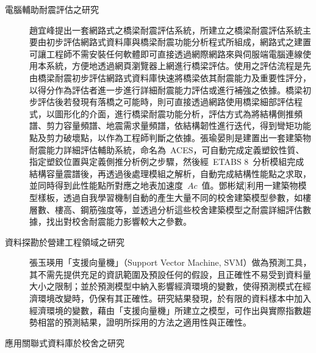\begin{description}
  \item[電腦輔助耐震評估之研究]
  趙宜峰\cite{chou2004master}提出一套網路式之橋梁耐震評估系統，所建立之橋梁耐震評估系統主要由初步評估網路式資料庫與橋梁耐震功能分析程式所組成，網路式之建置可讓工程師不需安裝任何軟體即可直接透過網際網路來與伺服端電腦連線使用本系統，方便地透過網頁瀏覽器上網進行橋梁評估。使用之評估流程是先由橋梁耐震初步評估網路式資料庫快速將橋梁依其耐震能力及重要性評分，以得分作為評估者進一步進行詳細耐震能力評估或進行補強之依據。橋梁初步評估後若發現有落橋之可能時，則可直接透過網路使用橋梁細部評估程式，以圖形化的介面，進行橋梁耐震功能分析，評估方式為將結構側推頻譜、剪力容量頻譜、地震需求量頻譜，依結構韌性進行迭代，得到彎矩功能點及剪力破壞點，以作為工程師判斷之依據。張瑜晏\cite{chang2004master}則是建置出一套建築物耐震能力詳細評估輔助系統，命名為~ACES，可自動完成定義塑鉸性質、指定塑鉸位置與定義側推分析例之步驟，然後經~ETABS 8~分析模組完成結構容量震譜後，再透過後處理模組之解析，自動完成結構性能點之求取，並同時得到此性能點所對應之地表加速度~$Ac$~值。鄧彬斌\cite{deng2005phd}]利用一建築物模型樣板，透過自我學習機制自動的產生大量不同的校舍建築模型參數，如樓層數、樓高、鋼筋強度等，並透過分析這些校舍建築模型之耐震詳細評估數據，找出對校舍耐震能力影響較大之參數。

  \item[資料探勘於營建工程領域之研究]
  張玉瑛\cite{chang2007master}用「支援向量機」（Support Vector Machine, SVM）做為預測工具，其不需先提供充足的資訊範圍及預設任何的假設，且正確性不易受到資料量大小之限制；並於預測模型中納入影響經濟環境的變數，使得預測模式在經濟環境改變時，仍保有其正確性。研究結果發現，於有限的資料樣本中加入經濟環境的變數，藉由「支援向量機」所建立之模型，可作出與實際指數趨勢相當的預測結果，證明所採用的方法之適用性與正確性。


  \item[應用關聯式資料庫於校舍之研究]


\end{description}